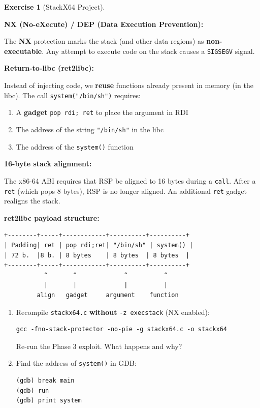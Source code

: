 \documentclass[a4paper,11pt]{article}
\theoremstyle{plain}
\theoremstyle{definition}
\newtheorem{exercice}{Exercise}
\begin{document}
\begin{exercice}[StackX64 Project]
\begin{rappel}
\textbf{NX (No-eXecute) / DEP (Data Execution Prevention):}

The \textbf{NX} protection marks the stack (and other data regions) as \textbf{non-executable}. Any attempt to execute code on the stack causes a \texttt{SIGSEGV} signal.

\medskip
\textbf{Return-to-libc (ret2libc):}

Instead of injecting code, we \textbf{reuse} functions already present in memory (in the libc). The call \texttt{system("/bin/sh")} requires:
\begin{enumerate}
    \item A \textbf{gadget} \texttt{pop rdi; ret} to place the argument in RDI
    \item The address of the string \texttt{"/bin/sh"} in the libc
    \item The address of the \texttt{system()} function
\end{enumerate}

\medskip
\textbf{16-byte stack alignment:}

The x86-64 ABI requires that RSP be aligned to 16 bytes during a \texttt{call}. After a \texttt{ret} (which pops 8 bytes), RSP is no longer aligned. An additional \texttt{ret} gadget realigns the stack.

\medskip
\textbf{ret2libc payload structure:}
\begin{lstlisting}[style=GDBStyle]
+--------+-----+------------+----------+----------+
| Padding| ret | pop rdi;ret| "/bin/sh" | system() |
| 72 b.  |8 b. | 8 bytes    | 8 bytes  | 8 bytes  |
+--------+-----+------------+----------+----------+
           ^       ^             ^          ^
           |       |             |          |
         align   gadget     argument    function
\end{lstlisting}
\end{rappel}

\begin{enumerate}
\item[\textbf{4a)}] Recompile \texttt{stackx64.c} \textbf{without} \texttt{-z execstack} (NX enabled):
\begin{lstlisting}[style=GDBStyle]
gcc -fno-stack-protector -no-pie -g stackx64.c -o stackx64
\end{lstlisting}
Re-run the Phase 3 exploit. What happens and why?

\item[\textbf{4b)}] Find the address of \texttt{system()} in GDB:
\begin{lstlisting}[style=GDBStyle]
(gdb) break main
(gdb) run
(gdb) print system
\end{lstlisting}


\end{enumerate}
\end{exercice}
\end{document}
